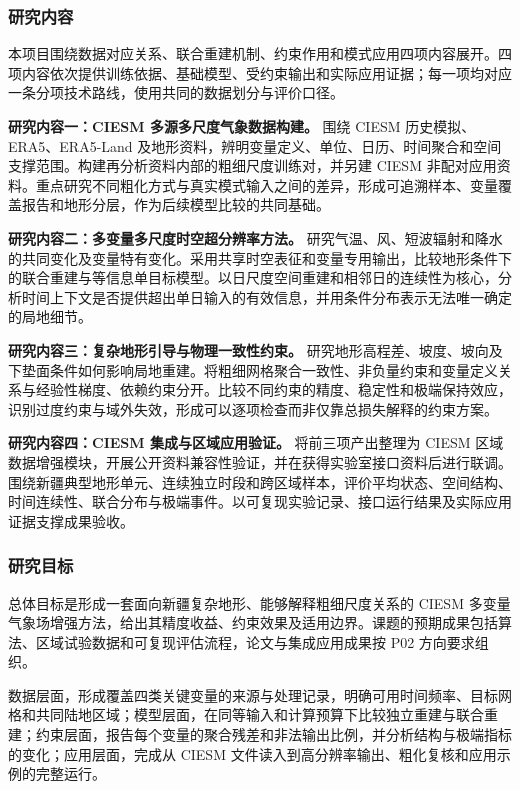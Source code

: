 \justifying
\NSFCBodyText

\subsubsection{研究内容}

本项目围绕数据对应关系、联合重建机制、约束作用和模式应用四项内容展开。四项内容依次提供训练依据、基础模型、受约束输出和实际应用证据；每一项均对应一条分项技术路线，使用共同的数据划分与评价口径。

\textbf{研究内容一：CIESM 多源多尺度气象数据构建。}
围绕 CIESM 历史模拟、ERA5、ERA5-Land 及地形资料，辨明变量定义、单位、日历、时间聚合和空间支撑范围。构建再分析资料内部的粗细尺度训练对，并另建 CIESM 非配对应用资料。重点研究不同粗化方式与真实模式输入之间的差异，形成可追溯样本、变量覆盖报告和地形分层，作为后续模型比较的共同基础。

\textbf{研究内容二：多变量多尺度时空超分辨率方法。}
研究气温、风、短波辐射和降水的共同变化及变量特有变化。采用共享时空表征和变量专用输出，比较地形条件下的联合重建与等信息单目标模型。以日尺度空间重建和相邻日的连续性为核心，分析时间上下文是否提供超出单日输入的有效信息，并用条件分布表示无法唯一确定的局地细节。

\textbf{研究内容三：复杂地形引导与物理一致性约束。}
研究地形高程差、坡度、坡向及下垫面条件如何影响局地重建。将粗细网格聚合一致性、非负量约束和变量定义关系与经验性梯度、依赖约束分开。比较不同约束的精度、稳定性和极端保持效应，识别过度约束与域外失效，形成可以逐项检查而非仅靠总损失解释的约束方案。

\textbf{研究内容四：CIESM 集成与区域应用验证。}
将前三项产出整理为 CIESM 区域数据增强模块，开展公开资料兼容性验证，并在获得实验室接口资料后进行联调。围绕新疆典型地形单元、连续独立时段和跨区域样本，评价平均状态、空间结构、时间连续性、联合分布与极端事件。以可复现实验记录、接口运行结果及实际应用证据支撑成果验收。

\subsubsection{研究目标}

总体目标是形成一套面向新疆复杂地形、能够解释粗细尺度关系的 CIESM 多变量气象场增强方法，给出其精度收益、约束效果及适用边界。课题的预期成果包括算法、区域试验数据和可复现评估流程，论文与集成应用成果按 P02 方向要求组织。

数据层面，形成覆盖四类关键变量的来源与处理记录，明确可用时间频率、目标网格和共同陆地区域；模型层面，在同等输入和计算预算下比较独立重建与联合重建；约束层面，报告每个变量的聚合残差和非法输出比例，并分析结构与极端指标的变化；应用层面，完成从 CIESM 文件读入到高分辨率输出、粗化复核和应用示例的完整运行。

